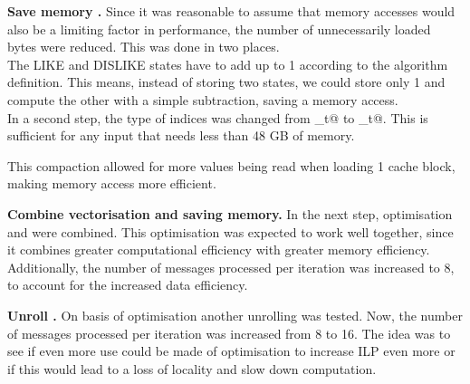 \documentclass[letterpaper]{article}
\newcommand{\mypar}[1]{{\bf #1.}}
\begin{document}

\mypar{Save memory }
Since it was reasonable to assume that memory accesses would also be a limiting factor in performance, the number of unnecessarily loaded bytes were reduced. This was done in two places.\\
The LIKE and DISLIKE states have to add up to 1 according to the algorithm definition. This means, instead of storing two states, we could store only 1 and compute the other with a simple subtraction, saving a memory access.\\
In a second step, the type of indices was changed from \verb@size_t@ to _t@. This is sufficient for any input that needs less than 48 GB of memory. 

This compaction allowed for more values being read when loading 1 cache block, making memory access more efficient.


\mypar{Combine vectorisation and saving memory}
In the next step, optimisation  and  were combined. This optimisation was expected to work well together, since it combines greater computational efficiency with greater memory efficiency. Additionally, the number of messages processed per iteration was increased to 8, to account for the increased data efficiency.


\mypar{Unroll }
On basis of optimisation  another unrolling was tested. Now, the number of messages processed per iteration was increased from 8 to 16. The idea was to see if even more use could be made of optimisation  to increase ILP even more  or if this would lead to a loss of locality and slow down computation.
\end{document}

